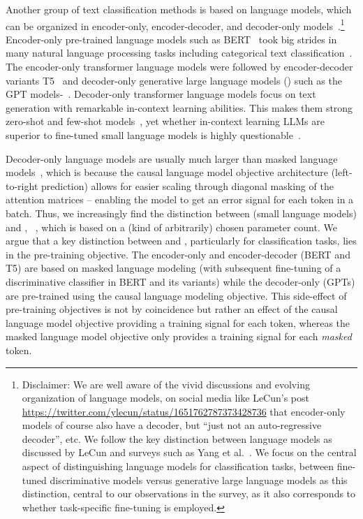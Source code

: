 Another group of text classification methods is based on language models, which can be organized in encoder-only, encoder-decoder, and decoder-only models~\cite{yang2023harnessing}.\footnote{Disclaimer:
We are well aware of the vivid discussions and evolving organization of language models, \eg on social media like LeCun's post \url{https://twitter.com/ylecun/status/1651762787373428736} that encoder-only models of course also have a decoder, but ``just not an auto-regressive decoder'', etc.    
We follow the key distinction between language models as discussed by LeCun and surveys such as Yang et al.~\cite{yang2023harnessing}.
We focus on the central aspect of distinguishing language models for classification tasks, \ie between fine-tuned discriminative models versus generative large language models as this distinction, central to our observations in the survey, as it also corresponds to whether task-specific fine-tuning is employed.
}
Encoder-only pre-trained language models such as BERT~\cite{DBLP:conf/naacl/DevlinCLT19} took big strides in many natural language processing tasks including categorical text classification~\cite{galke2023really,galkescherp-acl2022}. 
The encoder-only transformer language models were followed by encoder-decoder variants T5~\cite{T5} and decoder-only generative large language models (\LLMs) such as the GPT models-~\cite{DBLP:journals/corr/abs-2303-08774,DBLP:conf/nips/BrownMRSKDNSSAA20}.
Decoder-only transformer language models focus on text generation with remarkable in-context learning abilities.
This makes them strong zero-shot and few-shot models~\cite{carp,DBLP:conf/iclr/PatelLRCRC23,wei2022finetuned,DBLP:conf/nips/BrownMRSKDNSSAA20}, 
yet whether in-context learning LLMs are superior to fine-tuned small language models is highly questionable~\cite{DBLP:conf/acl/QoribMN24,
bucher2024finetunedsmallllmsstill,
lepagnol2024smalllanguagemodelsgood,
liu2024llmembedrethinkinglightweightllms,
edwards2024language,
li2023label}.

Decoder-only language models are usually much larger than masked language models~\cite{DBLP:conf/nips/BrownMRSKDNSSAA20}, which is because the causal language model objective architecture (left-to-right prediction) allows for easier scaling through diagonal masking of the attention matrices -- enabling the model to get an error signal for each token in a batch.
Thus, we increasingly find the distinction between \SLMs (small language models) and \LLMs, \eg~\cite{DBLP:conf/aaai/Hu0CSLW024,DBLP:journals/corr/abs-2402.12819,DBLP:journals/corr/abs-2402-16844}, which is based on a (kind of arbitrarily) chosen parameter count.
We argue that a key distinction between \SLMs and \LLMs, particularly for classification tasks, lies in the pre-training objective.
The encoder-only and encoder-decoder \SLMs (\eg BERT and T5) are based on masked language modeling (with subsequent fine-tuning of a discriminative classifier in BERT and its variants) while the decoder-only \LLMs (\eg GPTs) are pre-trained using the causal language modeling objective.
This side-effect of pre-training objectives is not by coincidence but rather an effect of the causal language model objective providing a training signal for each token, whereas the masked language model objective only provides a training signal for each \emph{masked} token.

